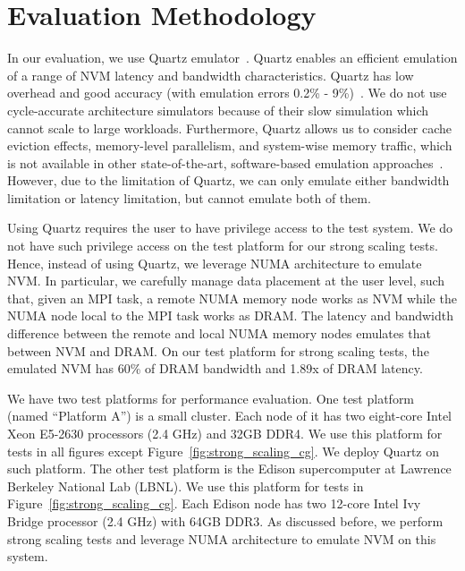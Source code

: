 \section{Evaluation Methodology}
\label{sec:eval_method}
In our evaluation, we use Quartz emulator~\cite{middleware15:volos}.
Quartz enables an efficient emulation of a range
of NVM latency and bandwidth characteristics. 
Quartz has low overhead and good accuracy (with emulation
errors 0.2\% - 9\%)~\cite{middleware15:volos}.
We do not use cycle-accurate architecture simulators because of
their slow simulation which cannot scale to large workloads.
Furthermore, Quartz allows us to consider cache eviction effects,
memory-level parallelism, and system-wise memory traffic, which is not available in other state-of-the-art, software-based emulation approaches~\cite{pcmsim, mnemosyne_asplos11}.
However, due to the limitation of Quartz, 
we can only emulate either bandwidth limitation or latency limitation,
but cannot emulate both of them.

Using Quartz requires the user to have privilege access to the test system.
We do not have such privilege access on the test platform for our strong scaling tests.
Hence, instead of using Quartz, we leverage NUMA architecture to emulate NVM.
In particular, we carefully manage data placement at the user level, 
such that, given an MPI task, a remote NUMA memory node works as NVM while the NUMA node local to the MPI task works as DRAM.
The latency and bandwidth difference between the remote and local NUMA memory nodes emulates that between NVM and DRAM.
On our test platform for strong scaling tests, the emulated NVM has 60\%
of DRAM bandwidth and 1.89x of DRAM latency.

We have two test platforms for performance evaluation.
One test platform (named ``Platform A'') is a small cluster. Each node of it has two eight-core Intel Xeon E5-2630 processors (2.4 GHz) and 
32GB DDR4. We use this platform for tests in all figures except Figure~\ref{fig:strong_scaling_cg}. %
We deploy Quartz on such platform.
The other test platform is the Edison supercomputer at Lawrence Berkeley National Lab (LBNL). We use this platform for tests in Figure~\ref{fig:strong_scaling_cg}. %
Each Edison node has two 12-core Intel Ivy Bridge processor (2.4 GHz) with 64GB DDR3. 
As discussed before, we perform strong scaling tests and leverage NUMA architecture to emulate NVM on this system. 

